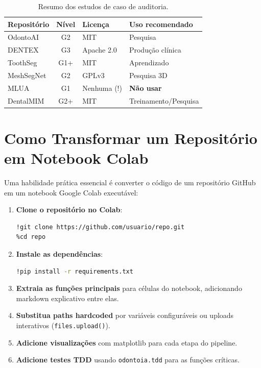 \begin{table}[H]
  \centering
  \caption{Resumo dos estudos de caso de auditoria.}
  \label{tab:audit-summary}
  \begin{tabularx}{\textwidth}{lclX}
    \toprule
    \textbf{Repositório} & \textbf{Nível} & \textbf{Licença} & \textbf{Uso recomendado} \\
    \midrule
    OdontoAI & G2 & MIT & Pesquisa \\
    DENTEX & G3 & Apache 2.0 & Produção clínica \\
    ToothSeg & G1+ & MIT & Aprendizado \\
    MeshSegNet & G2 & GPLv3 & Pesquisa 3D \\
    MLUA & G1 & Nenhuma (!) & \textbf{Não usar} \\
    DentalMIM & G2+ & MIT & Treinamento/Pesquisa \\
    \bottomrule
  \end{tabularx}
\end{table}

\section{Como Transformar um Repositório em Notebook Colab}

Uma habilidade prática essencial é converter o código de um repositório
GitHub em um notebook Google Colab executável:

\begin{enumerate}
  \item \textbf{Clone o repositório no Colab}:
\begin{lstlisting}[language=bash]
!git clone https://github.com/usuario/repo.git
%cd repo
\end{lstlisting}

  \item \textbf{Instale as dependências}:
\begin{lstlisting}[language=bash]
!pip install -r requirements.txt
\end{lstlisting}

  \item \textbf{Extraia as funções principais} para células do notebook,
    adicionando markdown explicativo entre elas.

  \item \textbf{Substitua paths hardcoded} por variáveis configuráveis
    ou uploads interativos (\texttt{files.upload()}).

  \item \textbf{Adicione visualizações} com matplotlib para cada etapa
    do pipeline.

  \item \textbf{Adicione testes TDD} usando \texttt{odontoia.tdd} para
    as funções críticas.
\end{enumerate}

